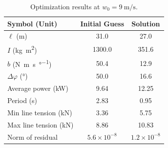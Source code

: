 \begin{table}[thpb]
\centering
\caption{Optimization results at $w_0 = \SI{9}{\meter\per\second}$.}
\begin{tabular}{l S S}
    \toprule
    {Symbol (Unit)} & {Initial Guess} & {Solution} \\
    \midrule
    $\ell$ (\si{\meter}) & 31.0 & 27.0 \\ 
    $I$ (\si{\kilogram\meter\squared}) & 1300.0 & 351.6 \\ 
    $b$ (\si{\newton\meter\second\per\degree}) & 50.4 & 12.9 \\ 
    $\Delta\varphi$ (\si{\degree}) & 50.0 & 16.6 \\ 
    \midrule
    Average power (\si{\kilo\watt}) & 9.64 & 12.25 \\ 
    Period (\si{\second}) & 2.83 & 0.95 \\ 
    Min line tension (\si{\kilo\newton}) & 3.36 & 5.75 \\ 
    Max line tension (\si{\kilo\newton}) & 8.86 & 10.83 \\ 
    Norm of residual & {$5.6\times10^{-8}$} & {$1.2\times10^{-8}$} \\ 
    \bottomrule
\end{tabular}
\label{tab:opt_results}
\end{table}
